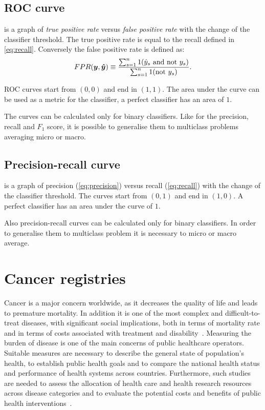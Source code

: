 \subsection{ROC curve} is a graph of \emph{true positive rate} versus
\emph{false positive rate} with the change of the classifier threshold. The
true positive rate is equal to the recall defined in
\cref{eq:recall}. Conversely the false positive rate is defined as:
\begin{equation}\label{eq:fpr}
FPR(\bm{y}, \bm{\hat y}) \equiv \frac{\sum_{s=1}^n 1(\hat
  y_s \text{ and not }y_s)}{\sum_{s=1}^n 1(\text{not }y_s)}.
\end{equation}

ROC curves start from $(0,0)$ and end in $(1,1)$. The area under
the curve can be used as a metric for the classifier, a perfect
classifier has an area of $1$.

The curves can be calculated only for binary classifiers. Like for the
precision, recall and $F_1$ score, it is possible to generalise them to
multiclass problems averaging micro or macro.

\subsection{Precision-recall curve} is a graph of precision
(\cref{eq:precision}) versus 
recall (\cref{eq:recall}) with the change of the classifier
threshold. The curves start from $(0,1)$ and end in $(1,0)$. A perfect
classifier has an area under the curve of $1$.

Also precision-recall curves can be calculated only for binary
classifiers. In order to generalise them to multiclass problem it is
necessary to micro or macro average.

\section{Cancer registries}
Cancer is a major concern worldwide, as it decreases the quality of
life and leads to premature mortality. In addition it is one of the
most complex and difficult-to-treat
diseases, with significant social implications, both in terms of
mortality rate and in terms of costs associated with treatment and
disability~\cite{sullivan_delivering_2011,b._stewart_world_2014,desantis_cancer_2014,siegel_cancer_2016}.
Measuring the burden of disease is one of the main concerns of public
healthcare operators. Suitable measures are necessary to describe the general state
of population’s health, to establish public health goals and to
compare the national health status and performance of health systems
across countries. Furthermore, such studies are needed to assess the
allocation of health care and health research resources across disease
categories and to evaluate the potential costs and benefits of public
health interventions~\cite{brown_burden_2001}.

